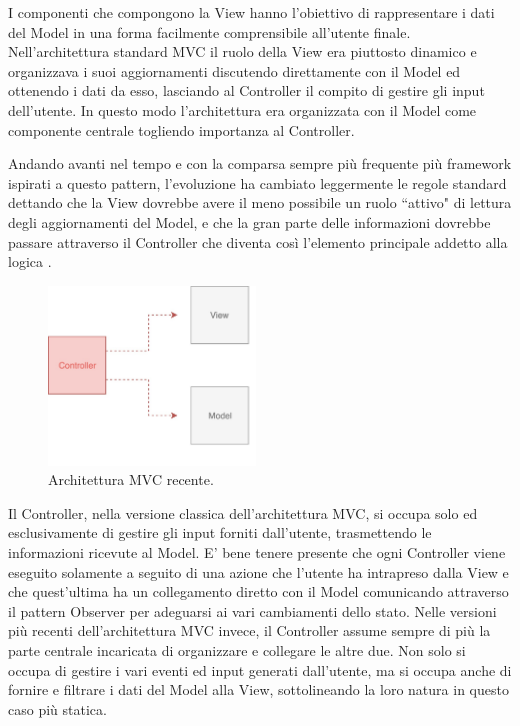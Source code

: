 I componenti che compongono la View hanno l'obiettivo di rappresentare i dati del Model in una forma facilmente comprensibile all'utente finale. Nell'architettura standard MVC il ruolo della View era piuttosto dinamico e organizzava i suoi aggiornamenti discutendo direttamente con il Model ed ottenendo i dati da esso, lasciando al Controller il compito di gestire gli input dell'utente. In questo modo l'architettura era organizzata con il Model come componente centrale togliendo importanza al Controller.

\noindent
Andando avanti nel tempo e con la comparsa sempre più frequente più framework ispirati a questo pattern, l'evoluzione ha cambiato leggermente le regole standard dettando che la View dovrebbe avere il meno possibile un ruolo “attivo" di lettura degli aggiornamenti del Model, e che la gran parte delle informazioni dovrebbe passare attraverso il Controller che diventa così l'elemento principale addetto alla logica \cite{HopkinsOnMVCandPHP}.

\begin{figure}
\centering 
\includegraphics[width=5.5cm]{./images/MVCpassiveview}
\caption{Architettura MVC recente.}
\end{figure}

Il Controller, nella versione classica dell'architettura MVC, si occupa solo ed esclusivamente di gestire gli input forniti dall'utente, trasmettendo le informazioni ricevute al Model. E' bene tenere presente che ogni Controller viene eseguito solamente a seguito di una azione che l'utente ha intrapreso dalla View e che quest'ultima ha un collegamento diretto con il Model comunicando attraverso il pattern Observer per adeguarsi ai vari cambiamenti dello stato.
Nelle versioni più recenti dell'architettura MVC invece, il Controller assume sempre di più la parte centrale incaricata di organizzare e collegare le altre due. Non solo si occupa di gestire i vari eventi ed input generati dall'utente, ma si occupa anche di fornire e filtrare i dati del Model alla View, sottolineando la loro natura in questo caso più statica.


